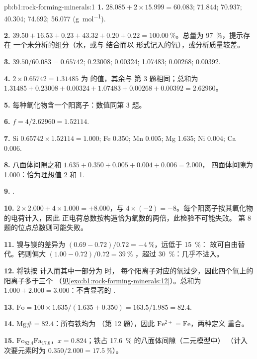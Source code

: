 \begin{solution}{pb:b1:rock-forming-minerals:1}
\textbf{1.}  $28.085 + 2\times15.999 = 60.083$;  71.844;
 70.937;  40.304;  74.692;  56.077
(\si{g.mol^{-1}}).

\textbf{2.} $39.50 + 16.53 + 0.23 + 43.32 + 0.20 + 0.22 =
\qty{100.00}{\percent}$。总量为 \qty{97}{\percent}，提示存在
一个未分析的组分（水，或与  结合而以
 形式记入的氧），或分析质量较差。

\textbf{3.}  $39.50/60.083 = 0.65742$;  0.23008; 
0.00324;  1.07483;  0.00268;  0.00392.

\textbf{4.} $2\times0.65742 = 1.31485$ 为  的值，其余与
第 3 题相同；总和为 $1.31485 + 0.23008 + 0.00324 + 1.07483 +
0.00268 + 0.00392 = 2.62960$。

\textbf{5.} 每种氧化物含一个阳离子：数值同第 3 题。

\textbf{6.} $f = 4/2.62960 = 1.52114$.

\textbf{7.} Si $0.65742\times1.52114 = 1.000$; Fe 0.350; Mn 0.005; Mg 1.635;
Ni 0.004; Ca 0.006.

\textbf{8.} 八面体间隙之和 $1.635 + 0.350 + 0.005 + 0.004 + 0.006 = 2.000$，
四面体间隙为 1.000：恰为理想值 2 和
1.

\textbf{9.} .

\textbf{10.} $2\times2.000 + 4\times1.000 = +8.000$，与 $4\times(-2) =
-8$。每个阳离子按其氧化物的电荷计入，因此
正电荷总数按构造恰为氧数的两倍，此检验不可能失败。
第 8 题的位点总数则可能失败。

\textbf{11.} 镍与镁的差异为
$(0.69 - 0.72)/0.72 = -\qty{4}{\percent}$，远低于 \qty{15}{\percent}：
故可自由替代。钙则偏大 $(1.00 - 0.72)/0.72 = \qty{39}{\percent}$
，超过 \qty{30}{\percent}：几乎不进入。

\textbf{12.} 将铁按  计入而其中一部分为  时，
每个阳离子对应的氧过少，因此四个氧上的阳离子多于三个
（见\cref{exo:b1:rock-forming-minerals:12}）。总和为 $1.000 + 2.000 = 3.000$：不含显著的
.

\textbf{13.} $\mathrm{Fo} = 100\times1.635/(1.635 + 0.350) = 163.5/1.985 =
82.4$.

\textbf{14.} $\mathrm{Mg\#} = 82.4$：所有铁均为 
（第 12 题），因此 $\mathrm{Fe^{2+}} = \mathrm{Fe}$，两种定义
重合。

\textbf{15.} $\text{Fo}_{82.4}\text{Fa}_{17.6}$，$x = 0.824$；铁占
\qty{17.6}{\percent} 的八面体间隙（二元模型中）
（计入次要元素时为 $0.350/2.000 = \qty{17.5}{\percent}$）。


\end{solution}
